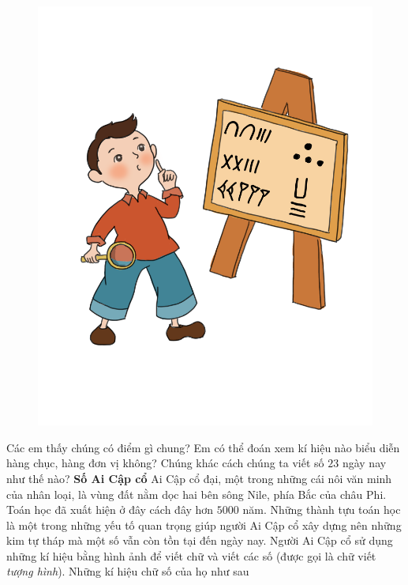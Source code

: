 		\begin{figure}
		\centering
		\vspace*{-20pt}
		\captionsetup{labelformat= empty, justification=centering}
		\includegraphics[width=1\linewidth]{20.12-pi}
		\vspace*{-35pt}
	\end{figure}
	Các em thấy chúng có điểm gì chung? Em có thể đoán xem kí hiệu nào biểu diễn hàng chục, hàng đơn vị không? Chúng khác cách chúng ta viết số $23$ ngày nay như thế nào?
	\vskip 0.1cm
	\textbf{\color{toancuabi}Số Ai Cập cổ}
	\vskip 0.1cm
	Ai Cập cổ đại, một trong những cái nôi văn minh của nhân loại, là vùng đất nằm dọc hai bên sông Nile, phía Bắc của châu Phi. Toán học đã xuất hiện ở đây cách đây hơn $5000$ năm. Những thành tựu toán học là một trong những yếu tố quan trọng giúp người Ai Cập cổ xây dựng nên những kim tự tháp mà một số vẫn còn tồn tại đến ngày nay. 
	\vskip 0.1cm
	Người Ai Cập cổ sử dụng những kí hiệu bằng hình ảnh để viết chữ và viết các số (được gọi là chữ viết \textit{tượng hình}). Những kí hiệu chữ số của họ như sau 
